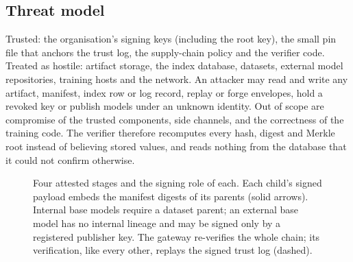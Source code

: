 \documentclass[conference]{IEEEtran}
\newcommand{\role}[1]{{\fontsize{4.6}{5.2}\selectfont\ttfamily #1}}
\begin{document}
\subsection{Threat model}
Trusted: the organisation's signing keys (including the root key), the small pin file that anchors the trust log, the supply-chain policy and the verifier code. Treated as hostile: artifact storage, the index database, datasets, external model repositories, training hosts and the network. An attacker may read and write any artifact, manifest, index row or log record, replay or forge envelopes, hold a revoked key or publish models under an unknown identity. Out of scope are compromise of the trusted components, side channels, and the correctness of the training code. The verifier therefore recomputes every hash, digest and Merkle root instead of believing stored values, and reads nothing from the database that it could not confirm otherwise.

\begin{figure}[t]
\centering
{}
\caption{Four attested stages and the signing role of each. Each child's signed payload embeds the manifest digests of its parents (solid arrows). Internal base models require a dataset parent; an external base model has no internal lineage and may be signed only by a registered publisher key. The gateway re-verifies the whole chain; its verification, like every other, replays the signed trust log (dashed).}
\label{fig:arch}
\end{figure}
\end{document}
